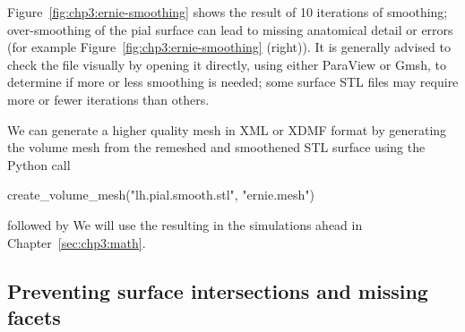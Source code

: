 Figure~\ref{fig:chp3:ernie-smoothing} shows the result of 10
iterations of smoothing; over-smoothing of
the pial surface can lead to missing anatomical detail or errors
(for example Figure~\ref{fig:chp3:ernie-smoothing} (right)). It is generally 
advised to check the file visually by opening it directly, using either
ParaView or Gmsh, to determine if more or less smoothing is needed;
some surface STL files may require more or fewer iterations than
others.

We can generate a higher quality mesh in XML or XDMF format by
generating the volume mesh from the remeshed and smoothened STL
surface using the Python call
\begin{python}
create_volume_mesh("lh.pial.smooth.stl", "ernie.mesh")
\end{python}
followed by
\noindent We will use the resulting  in the
simulations ahead in Chapter~\ref{sec:chp3:math}.

\subsection{Preventing surface intersections and missing facets}
\label{subsec:chp3:preventing-surface-intersections}


